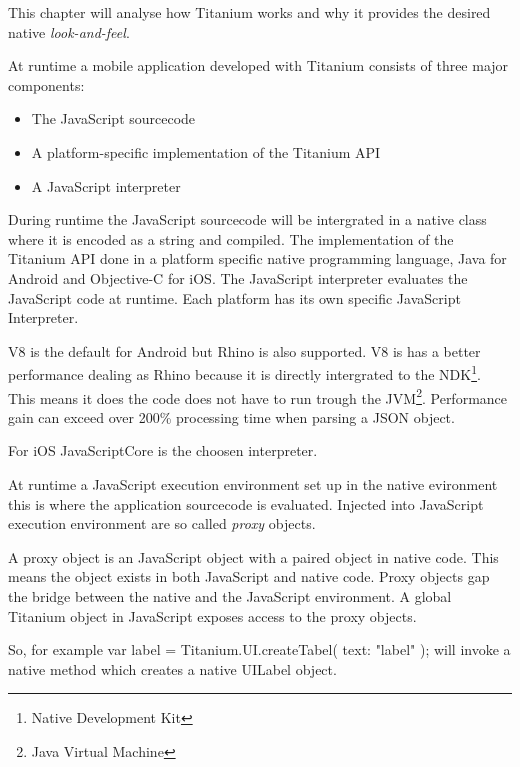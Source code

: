 
This chapter will analyse how Titanium works and why it provides the desired native \emph{look-and-feel}.



At runtime a mobile application developed with Titanium consists of three major components:
\begin{itemize}
	\item
	The JavaScript sourcecode
	\item
	A platform-specific implementation of the Titanium API
	\item
	A JavaScript interpreter
\end{itemize}

During runtime the JavaScript sourcecode will be intergrated in a native class where it is encoded as a string and compiled. The implementation of the Titanium API done in a platform specific native programming language, Java for Android and Objective-C for iOS. The JavaScript interpreter evaluates the JavaScript code at runtime. Each platform has its own specific JavaScript Interpreter.

V8 is the default for Android but Rhino is also supported. V8 is has a better performance dealing as Rhino because it is directly intergrated to the NDK\footnote{Native Development Kit}. This means it does the code does not have to run trough the JVM\footnote{Java Virtual Machine}. Performance gain can exceed over 200\% processing time when parsing a JSON object.\cite{Lukasavage2011}

For iOS JavaScriptCore is the choosen interpreter.

At runtime a JavaScript execution environment set up in the native evironment this is where the application sourcecode is evaluated. Injected into JavaScript execution environment are so called \emph{proxy} objects.

A proxy object is an JavaScript object with a paired object in native code.\cite{Whinnery2012} This means the object exists in both JavaScript and native code. Proxy objects gap the bridge between the native and the JavaScript environment. A global Titanium object in JavaScript exposes access to the proxy objects. 

So, for example var label = Titanium.UI.createTabel({ text: "label" }); will invoke a native method which creates a native UILabel object. 

